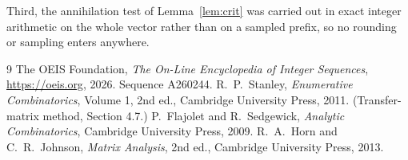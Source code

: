 \documentclass[11pt,a4paper]{article}
\theoremstyle{plain}
\theoremstyle{definition}
\begin{document}
Third, the annihilation test of Lemma~\ref{lem:crit} was carried out in exact integer
arithmetic on the whole vector rather than on a sampled prefix, so no rounding or sampling
enters anywhere.

\begin{thebibliography}{9}
 The OEIS Foundation, \emph{The On-Line Encyclopedia of Integer
Sequences}, \url{https://oeis.org}, 2026. Sequence A260244.
 R.~P.~Stanley, \emph{Enumerative Combinatorics}, Volume 1, 2nd ed.,
Cambridge University Press, 2011. (Transfer-matrix method, Section 4.7.)
 P.~Flajolet and R.~Sedgewick, \emph{Analytic Combinatorics}, Cambridge
University Press, 2009.
 R.~A.~Horn and C.~R.~Johnson, \emph{Matrix Analysis}, 2nd ed., Cambridge
University Press, 2013.
\end{thebibliography}
\end{document}
